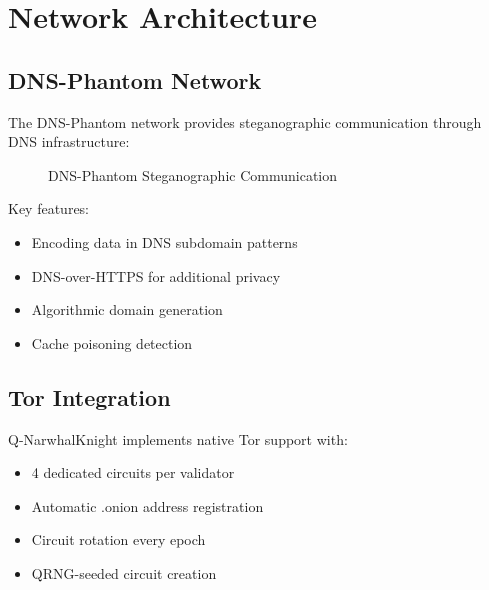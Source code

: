 \documentclass[11pt,a4paper]{article}
\begin{document}
\section{Network Architecture}

\subsection{DNS-Phantom Network}

The DNS-Phantom network provides steganographic communication through DNS infrastructure:

\begin{figure}[h]
\centering
{}
\caption{DNS-Phantom Steganographic Communication}
\end{figure}

Key features:
\begin{itemize}
    \item Encoding data in DNS subdomain patterns
    \item DNS-over-HTTPS for additional privacy
    \item Algorithmic domain generation
    \item Cache poisoning detection
\end{itemize}

\subsection{Tor Integration}

Q-NarwhalKnight implements native Tor support with:
\begin{itemize}
    \item 4 dedicated circuits per validator
    \item Automatic .onion address registration
    \item Circuit rotation every epoch
    \item QRNG-seeded circuit creation
\end{itemize}
\end{document}
